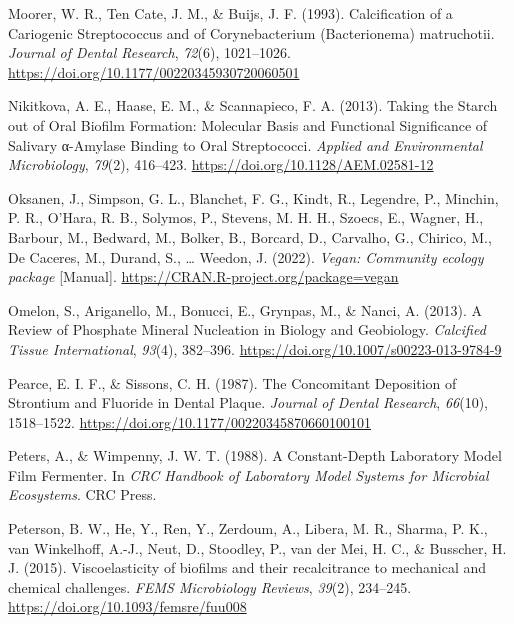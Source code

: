\documentclass[
]{article}
\newlength{\cslhangindent}
\newlength{\cslentryspacingunit} %
\newenvironment{CSLReferences}[2] %
 {%
  \setlength{\parindent}{0pt}
  \ifodd #1
  \let\oldpar\par
  \def\par{\hangindent=\cslhangindent\oldpar}
  \fi
  \setlength{\parskip}{#2\cslentryspacingunit}
 }%
 {}
\begin{document}
\begin{CSLReferences}{1}{0}
\leavevmode{}%
Moorer, W. R., Ten Cate, J. M., \& Buijs, J. F. (1993). Calcification of
a {Cariogenic Streptococcus} and of {Corynebacterium} ({Bacterionema})
matruchotii. \emph{Journal of Dental Research}, \emph{72}(6),
1021--1026. \url{https://doi.org/10.1177/00220345930720060501}

\leavevmode{}%
Nikitkova, A. E., Haase, E. M., \& Scannapieco, F. A. (2013). Taking the
{Starch} out of {Oral Biofilm Formation}: {Molecular Basis} and
{Functional Significance} of {Salivary} α-{Amylase Binding} to {Oral
Streptococci}. \emph{Applied and Environmental Microbiology},
\emph{79}(2), 416--423. \url{https://doi.org/10.1128/AEM.02581-12}

\leavevmode{}%
Oksanen, J., Simpson, G. L., Blanchet, F. G., Kindt, R., Legendre, P.,
Minchin, P. R., O'Hara, R. B., Solymos, P., Stevens, M. H. H., Szoecs,
E., Wagner, H., Barbour, M., Bedward, M., Bolker, B., Borcard, D.,
Carvalho, G., Chirico, M., De Caceres, M., Durand, S., \ldots{} Weedon,
J. (2022). \emph{Vegan: {Community} ecology package} {[}Manual{]}.
\url{https://CRAN.R-project.org/package=vegan}

\leavevmode{}%
Omelon, S., Ariganello, M., Bonucci, E., Grynpas, M., \& Nanci, A.
(2013). A {Review} of {Phosphate Mineral Nucleation} in {Biology} and
{Geobiology}. \emph{Calcified Tissue International}, \emph{93}(4),
382--396. \url{https://doi.org/10.1007/s00223-013-9784-9}

\leavevmode{}%
Pearce, E. I. F., \& Sissons, C. H. (1987). The {Concomitant Deposition}
of {Strontium} and {Fluoride} in {Dental Plaque}. \emph{Journal of
Dental Research}, \emph{66}(10), 1518--1522.
\url{https://doi.org/10.1177/00220345870660100101}

\leavevmode{}%
Peters, A., \& Wimpenny, J. W. T. (1988). A {Constant-Depth Laboratory
Model Film Fermenter}. In \emph{{CRC Handbook} of {Laboratory Model
Systems} for {Microbial Ecosystems}}. {CRC Press}.

\leavevmode{}%
Peterson, B. W., He, Y., Ren, Y., Zerdoum, A., Libera, M. R., Sharma, P.
K., van Winkelhoff, A.-J., Neut, D., Stoodley, P., van der Mei, H. C.,
\& Busscher, H. J. (2015). Viscoelasticity of biofilms and their
recalcitrance to mechanical and chemical challenges. \emph{FEMS
Microbiology Reviews}, \emph{39}(2), 234--245.
\url{https://doi.org/10.1093/femsre/fuu008}


\end{CSLReferences}
\end{document}
